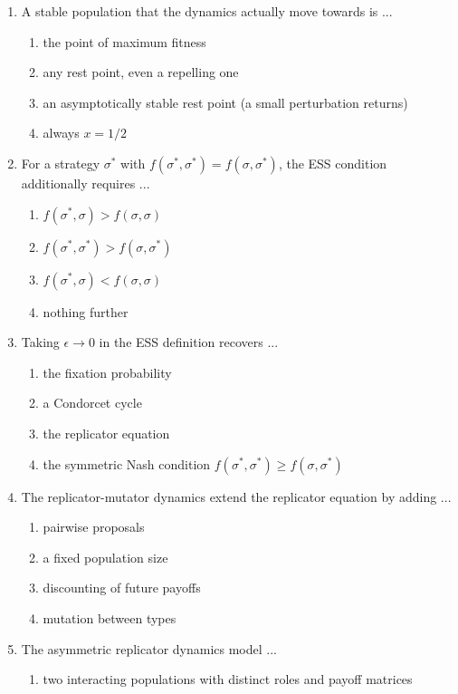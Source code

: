 \documentclass[11pt]{article}
\begin{document}
\begin{enumerate}[itemsep=6pt]
\begin{enumerate}
  \end{enumerate}
  \item A stable population that the dynamics actually move towards is ...
  \begin{enumerate}
    \item the point of maximum fitness
    \item any rest point, even a repelling one
    \item an asymptotically stable rest point (a small perturbation returns)
    \item always \(x = 1/2\)
  \end{enumerate}
  \item For a strategy \(\sigma^*\) with \(f(\sigma^*, \sigma^*) = f(\sigma, \sigma^*)\), the ESS condition additionally requires ...
  \begin{enumerate}
    \item \(f(\sigma^*, \sigma) > f(\sigma, \sigma)\)
    \item \(f(\sigma^*, \sigma^*) > f(\sigma, \sigma^*)\)
    \item \(f(\sigma^*, \sigma) < f(\sigma, \sigma)\)
    \item nothing further
  \end{enumerate}
  \item Taking \(\epsilon \to 0\) in the ESS definition recovers ...
  \begin{enumerate}
    \item the fixation probability
    \item a Condorcet cycle
    \item the replicator equation
    \item the symmetric Nash condition \(f(\sigma^*, \sigma^*) \ge f(\sigma, \sigma^*)\)
  \end{enumerate}
  \item The replicator-mutator dynamics extend the replicator equation by adding ...
  \begin{enumerate}
    \item pairwise proposals
    \item a fixed population size
    \item discounting of future payoffs
    \item mutation between types
  \end{enumerate}
  \item The asymmetric replicator dynamics model ...
  \begin{enumerate}
    \item two interacting populations with distinct roles and payoff matrices

\end{enumerate}
\end{enumerate}
\end{document}
